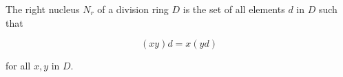 The right nucleus $N_r$ of a division ring $D$ is the set of all elements $d$ in $D$ such that

$$(xy)d = x(yd)$$

for all $x, y$ in $D$.
